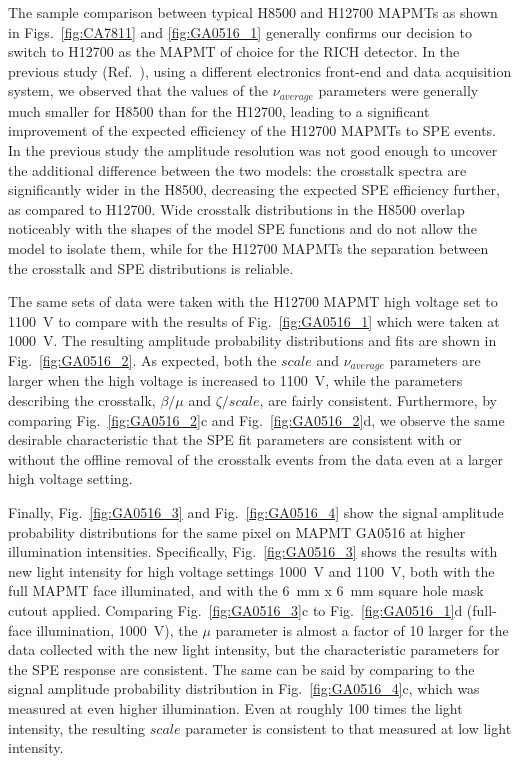 The sample comparison between typical H8500 and H12700 MAPMTs as shown in Figs.~\ref{fig:CA7811} and \ref{fig:GA0516_1} generally confirms our decision to switch to H12700 as the MAPMT of choice for the RICH detector. In the previous study (Ref.~\cite{DEGTIARENKO20171}), using a different electronics front-end and data acquisition system, we observed that the values of the $\nu_{average}$ parameters were generally much smaller for H8500 than for the H12700, leading to a significant improvement of the expected efficiency of the H12700 MAPMTs to SPE events. In the previous study the amplitude resolution was not good enough to uncover the additional difference between the two models: the crosstalk spectra are significantly wider in the H8500, decreasing the expected SPE efficiency further, as compared to H12700. Wide crosstalk distributions in the H8500 overlap noticeably with the shapes of the model SPE functions and do not allow the model to isolate them, while for the H12700 MAPMTs the separation between the crosstalk and SPE distributions is reliable.  

The same sets of data were taken with the H12700 MAPMT high voltage set to 1100~V to compare with the results of Fig.~\ref{fig:GA0516_1} which were taken at 1000~V. 
The resulting amplitude probability distributions and fits are shown in Fig.~\ref{fig:GA0516_2}. 
As expected, both the $scale$ and $\nu_{average}$ parameters are larger when the high voltage is increased to 1100~V, while the parameters describing the crosstalk, $\beta/\mu$ and $\zeta/scale$, are fairly consistent. 
Furthermore, by comparing Fig.~\ref{fig:GA0516_2}c and Fig.~\ref{fig:GA0516_2}d, we observe the same desirable characteristic that the SPE fit parameters are consistent with or without the offline removal of the crosstalk events from the data even at a larger high voltage setting.


Finally, Fig.~\ref{fig:GA0516_3} and Fig.~\ref{fig:GA0516_4} show the signal amplitude probability distributions for the same pixel on MAPMT GA0516 at higher illumination intensities. 
Specifically, Fig.~\ref{fig:GA0516_3} shows the results with new light intensity for high voltage settings 1000~V and 1100~V, both with the full MAPMT face illuminated, and with the 6~mm x 6~mm square hole mask cutout applied. 
Comparing Fig.~\ref{fig:GA0516_3}c to Fig.~\ref{fig:GA0516_1}d (full-face illumination, 1000~V), the $\mu$ parameter is almost a factor of 10 larger for the data collected with the new light intensity, but the characteristic parameters for the SPE response are consistent. 
The same can be said by comparing to the signal amplitude probability distribution in Fig.~\ref{fig:GA0516_4}c, which was measured at even higher illumination.
Even at roughly 100 times the light intensity, the resulting $scale$ parameter is consistent to that measured at low light intensity. 

